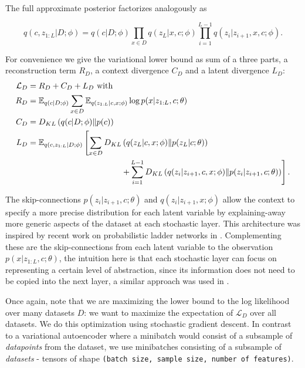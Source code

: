 \documentclass{article} \usepackage{iclr2017_conference,times}
\newcommand{\KL}[2]{D_{KL} \left (#1 \| #2 \right )}
\begin{document}
The full approximate posterior factorizes analogously as 

\begin{equation}
    q(c,z_{1:L} | D; \phi) = q(c | D; \phi) \prod_{x \in D} q(z_L | x,c; \phi) \prod_{i=1}^{L-1} q(z_{i} | z_{i+1},x,c;\phi).
\end{equation}

For convenience we give the variational lower bound as sum of a three parts, a reconstruction term $R_D$, a context divergence $C_D$ and a latent divergence $L_D$:
\begin{align}
\label{var_lower_bound}
    \mathcal{L}_D &= R_D + C_D + L_D \mbox{ with }\\
    R_D & = \mathbb{E}_{q(c | D;\phi)} 
    \sum_{x \in D} 
    \mathbb{E}_{q(z_{1:L}|c,x ;\phi)} 
    \log p(x|z_{1:L},c ;\theta) \\
    C_D &= \KL{q(c | D ; \phi)}{p(c)}\\
    L_D &= \mathbb{E}_{q(c, z_{1:L} | D ;\phi)} \left [ \sum_{x \in D} \KL{q(z_L | c,x ; \phi)}{p(z_L | c ; \theta)} \right. \nonumber \\ 
    & 
    \mbox{\hspace{4cm}}\left. +\sum_{i=1}^{L-1}
    \KL{q(z_i | z_{i+1},c,x ; \phi)}{p(z_i | z_{i+1},c ; \theta)}
    \right ].
\end{align}

The skip-connections $p(z_i | z_{i+1}, c; \theta)$ and $q(z_i | z_{i+1},x ;\phi)$ allow the context to specify a more precise distribution  for each latent variable by explaining-away more generic aspects of the dataset at each stochastic layer. This architecture was inspired by recent work on probabilistic ladder networks in \citet{prob_ladder}. Complementing these are the skip-connections from each latent variable to the observation $p(x | z_{1:L},c ; \theta)$, the intuition here is that each stochastic layer can focus on representing a certain level of abstraction, since its information does not need to be copied into the next layer, a similar approach was used in \citet{auxiliary_ladder}.

Once again, note that we are maximizing the lower bound to the log likelihood over many datasets $D$: we want to maximize the expectation of $\mathcal{L}_D$ over all datasets. We do this optimization using stochastic gradient descent. In contrast to a variational autoencoder where a minibatch would consist of a subsample of \emph{datapoints} from the dataset, we use minibatches consisting of a subsample of \emph{datasets} - tensors of shape \texttt{(batch size, sample size, number of features)}.
\end{document}
